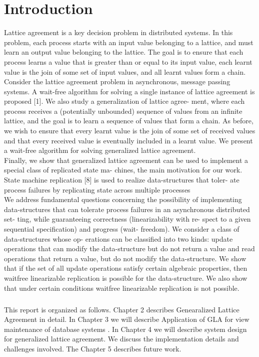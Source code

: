 \documentclass[a4paper,12pt]{report}
\begin{document}
\chapter{Introduction}             %
\label{chap:intro}
Lattice agreement is a key decision problem in distributed
systems. In this problem, each process starts with an input
value belonging to a lattice, and must learn an output value
belonging to the lattice. The goal is to ensure that each
process learns a value that is greater than or equal to its
input value, each learnt value is the join of some set of input
values, and all learnt values form a chain.\\ Consider the lattice agreement problem
in asynchronous, message passing systems. A
wait-free algorithm for solving a single instance of lattice
agreement is proposed [1]. We also study a generalization of lattice agree-
ment, where each process receives a (potentially unbounded)
sequence of values from an infinite lattice, and the goal is to
learn a sequence of values that form a chain. As before, we
wish to ensure that every learnt value is the join of some set
of received values and that every received value is eventually
included in a learnt value. We present a wait-free algorithm
for solving generalized lattice agreement.\\
Finally, we show that generalized lattice agreement can
be used to implement a special class of replicated state ma-
chines, the main motivation for our work. State machine
replication [8] is used to realize data-structures that toler-
ate process failures by replicating state across multiple processes\\
We address fundamental questions concerning the possibility of implementing data-structures that can
tolerate process failures in an asynchronous distributed set-
ting, while guaranteeing correctness (linearizability with re-
spect to a given sequential specification) and progress (wait-
freedom). We consider a class of data-structures whose op-
erations can be classified into two kinds: update operations
that can modify the data-structure but do not return a value
and read operations that return a value, but do not modify
the data-structure. We show that if the set of all update
operations satisfy certain algebraic properties, then waitfree
linearizable replication is possible for the data-structure. We
also show that under certain conditions waitfree linearizable
replication is not possible.




\paragraph*{}
This report is organized as follows. Chapter 2 describes Genearalized Lattice Agreement in detail. In Chapter 3 we will describe Application of GLA for view maintenance of database systems . In Chapter 4 we will describe system design for generalized lattice agreement. We discuss the implementation details and challenges involved. The Chapter 5 describes future work.
\end{document}
